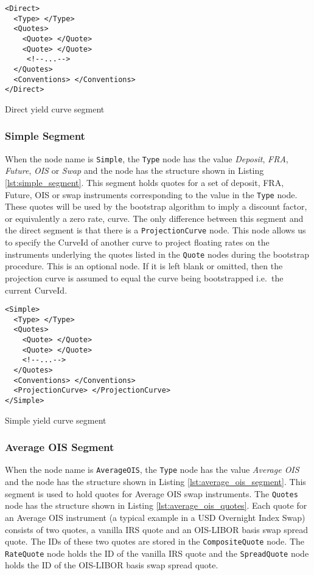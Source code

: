 \begin{listing}[H]
\begin{verbatim}
<Direct>
  <Type> </Type>
  <Quotes>
    <Quote> </Quote>
    <Quote> </Quote>
     <!--...-->
  </Quotes>
  <Conventions> </Conventions>
</Direct>
\end{verbatim}
\caption{Direct yield curve segment}
\label{lst:direct_segment}
\end{listing}


\subsubsection*{Simple Segment}
When the node name is \lstinline!Simple!, the \lstinline!Type! node has the value \emph{Deposit}, \emph{FRA},
\emph{Future}, \emph{OIS} or \emph{Swap} and the node has the structure shown in Listing \ref{lst:simple_segment}. This
segment holds quotes for a set of deposit, FRA, Future, OIS or swap instruments corresponding to the value in the
\lstinline!Type! node. These quotes will be used by the bootstrap algorithm to imply a discount factor, or equivalently
a zero rate, curve. The only difference between this segment and the direct segment is that there is a
\lstinline!ProjectionCurve! node. This node allows us to specify the CurveId of another curve to project floating rates
on the instruments underlying the quotes listed in the \lstinline!Quote! nodes during the bootstrap procedure. This is
an optional node. If it is left blank or omitted, then the projection curve is assumed to equal the curve being
bootstrapped i.e.\ the current CurveId.

\begin{listing}[H]
\begin{verbatim}
<Simple>
  <Type> </Type>
  <Quotes>
    <Quote> </Quote>
    <Quote> </Quote>
    <!--...-->
  </Quotes>
  <Conventions> </Conventions>
  <ProjectionCurve> </ProjectionCurve>
</Simple>
\end{verbatim}
\caption{Simple yield curve segment}
\label{lst:simple_segment}
\end{listing}

\subsubsection*{Average OIS Segment}
When the node name is \lstinline!AverageOIS!, the \lstinline!Type! node has the value \emph{Average OIS} and the node
has the structure shown in Listing \ref{lst:average_ois_segment}. This segment is used to hold quotes for Average OIS
swap instruments. The \lstinline!Quotes! node has the structure shown in Listing \ref{lst:average_ois_quotes}. Each
quote for an Average OIS instrument (a typical example in a USD Overnight Index Swap) consists of two quotes, a vanilla
IRS quote and an OIS-LIBOR basis swap spread quote.  The IDs of these two quotes are stored in the
\lstinline!CompositeQuote! node. The \lstinline!RateQuote! node holds the ID of the vanilla IRS quote and the
\lstinline!SpreadQuote! node holds the ID of the OIS-LIBOR basis swap spread quote.

